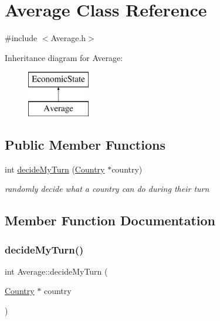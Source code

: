 \hypertarget{class_average}{}\section{Average Class Reference}
\label{class_average}


{\ttfamily \#include $<$Average.\+h$>$}

Inheritance diagram for Average\+:\begin{figure}[H]
\begin{center}
\leavevmode
\includegraphics[height=2.000000cm]{class_average}
\end{center}
\end{figure}
\subsection*{Public Member Functions}
\begin{DoxyCompactItemize}
\item 
int \mbox{\hyperlink{class_average_a9f12fe85255eea770296e0f30fe80a61}{decide\+My\+Turn}} (\mbox{\hyperlink{class_country}{Country}} $\ast$country)
\begin{DoxyCompactList}\small\item\em randomly decide what a country can do during their turn \end{DoxyCompactList}\end{DoxyCompactItemize}


\subsection{Member Function Documentation}
\mbox{\label{class_average_a9f12fe85255eea770296e0f30fe80a61}} 
\subsubsection{\texorpdfstring{decideMyTurn()}{decideMyTurn()}}
{\footnotesize\ttfamily int Average\+::decide\+My\+Turn (\begin{DoxyParamCaption}\item[{\mbox{\hyperlink{class_country}{Country}} $\ast$}]{country }\end{DoxyParamCaption})\hspace{0.3cm}{\ttfamily [virtual]}}



